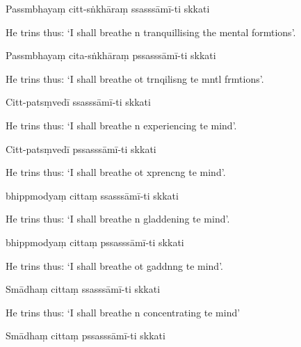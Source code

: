 Passmbhayaṃ citt-sṅkhāraṃ ssasssāmī-ti skkati

\begin{english}
  He trins thus: `I shall breathe n tranquillising the mental formtions'.
\end{english}

Passmbhayaṃ cita-sṅkhāraṃ pssasssāmī-ti skkati

\begin{english}
  He trins thus: `I shall breathe ot trnqilisng te mntl frmtions'.
\end{english}

Citt-patsṃvedī ssasssāmī-ti skkati

\begin{english}
  He trins thus: `I shall breathe n experiencing te mind'.
\end{english}

Citt-patsṃvedī pssasssāmī-ti skkati

\begin{english}
  He trins thus: `I shall breathe ot xprencng te mind'.
\end{english}

bhippmodyaṃ cittaṃ ssasssāmī-ti skkati

\begin{english}
  He trins thus: `I shall breathe n gladdening te mind'.
\end{english}

bhippmodyaṃ cittaṃ pssasssāmī-ti skkati

\begin{english}
  He trins thus: `I shall breathe ot gaddnng te mind'.
\end{english}

Smādhaṃ cittaṃ ssasssāmī-ti skkati

\begin{english}
  He trins thus: `I shall breathe n concentrating te mind'
\end{english}

Smādhaṃ cittaṃ pssasssāmī-ti skkati

